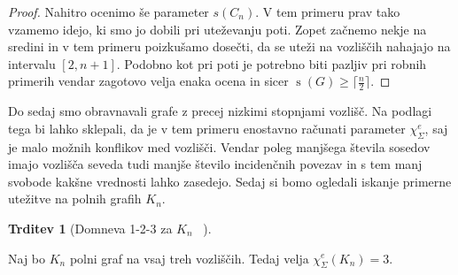 \documentclass[12pt,a4paper,twoside]{article}
\theoremstyle{definition} %
\theoremstyle{plain} %
\newtheorem{trditev}[definicija]{Trditev}
\newcommand{\ec}{\chi_{\Sigma}^e}
\numberwithin{equation}{section}  %
\DeclareMathOperator{\s}{s}
\begin{document}
\begin{proof}
Nahitro ocenimo še parameter $s(C_n)$. V tem primeru prav tako vzamemo idejo, ki smo jo dobili pri uteževanju poti. Zopet začnemo nekje na sredini in v tem primeru poizkušamo dosečti, da se uteži na vozliščih nahajajo na intervalu $[2, n+1]$. Podobno kot pri poti je potrebno biti pazljiv pri robnih primerih vendar zagotovo velja enaka ocena in sicer $\s(G) \ge \lceil \frac{n}{2} \rceil$.
	
	
\end{proof}
Do sedaj smo obravnavali grafe z precej nizkimi stopnjami vozlišč. Na podlagi tega bi lahko sklepali, da je v tem primeru enostavno računati parameter $\ec$, saj je malo možnih konflikov med vozlišči. Vendar poleg manjšega števila sosedov imajo vozlišča seveda tudi manjše število incidenčnih povezav in s tem manj svobode kakšne vrednosti lahko zasedejo. Sedaj si bomo ogledali iskanje primerne utežitve na polnih grafih $K_n$. 
\begin{trditev}[Domneva 1-2-3 za $K_n$~\citet{examples} ]
\end{trditev}
Naj bo $K_n$ polni graf na vsaj treh vozliščih. Tedaj velja $\ec(K_n) = 3$.
\end{document}
